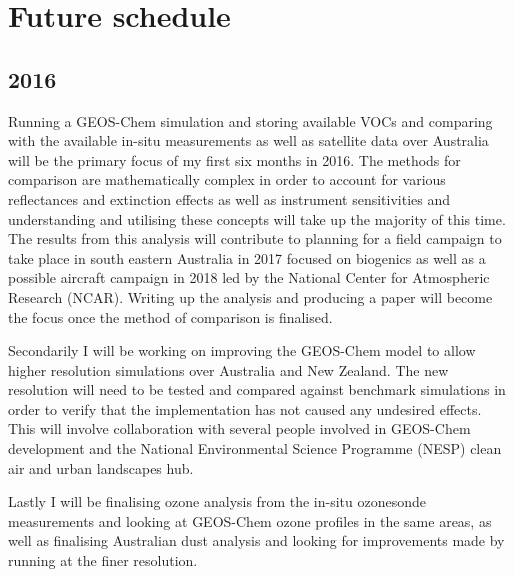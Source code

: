 \section{Future schedule}

\subsection{2016}

Running a GEOS-Chem simulation and storing available VOCs and comparing with the available in-situ measurements as well as satellite data over Australia will be the primary focus of my first six months in 2016.
The methods for comparison are mathematically complex in order to account for various reflectances and extinction effects as well as instrument sensitivities and understanding and utilising these concepts will take up the majority of this time.
The results from this analysis will contribute to planning for a field campaign to take place in south eastern Australia in 2017 focused on biogenics as well as a possible aircraft campaign in 2018 led by the National Center for Atmospheric Research (NCAR).
Writing up the analysis and producing a paper will become the focus once the method of comparison is finalised.

Secondarily I will be working on improving the GEOS-Chem model to allow higher resolution simulations over Australia and New Zealand.
The new resolution will need to be tested and compared against benchmark simulations in order to verify that the implementation has not caused any undesired effects.
This will involve collaboration with several people involved in GEOS-Chem development and the National Environmental Science Programme (NESP) clean air and urban landscapes hub.

Lastly I will be finalising ozone analysis from the in-situ ozonesonde measurements and looking at GEOS-Chem ozone profiles in the same areas, as well as finalising Australian dust analysis and looking for improvements made by running at the finer resolution.

